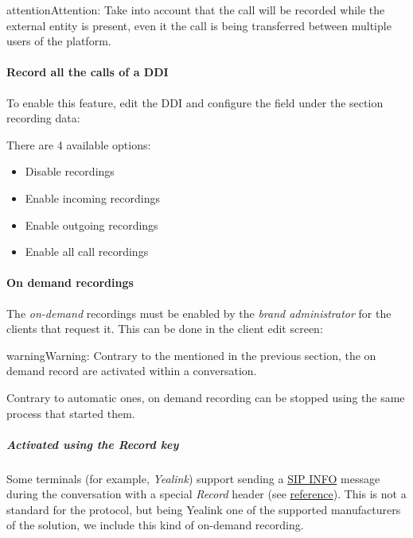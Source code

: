 \documentclass[letterpaper,10pt,english]{sphinxmanual}
\begin{document}
\begin{notice}{attention}{Attention:}
Take into account that the call will be recorded while the
external entity is present, even it the call is being transferred between
multiple users of the platform.
\end{notice}
\paragraph{Record all the calls of a DDI}

To enable this feature, edit the DDI and configure the field under the section
recording data:

There are 4 available options:
\begin{itemize}
\item {} 
Disable recordings

\item {} 
Enable incoming recordings

\item {} 
Enable outgoing recordings

\item {} 
Enable all call recordings

\end{itemize}


\paragraph{On demand recordings}
\label{administration_portal/client/vpbx/calls/call_recordings:on-demand-recordings}
The \emph{on-demand} recordings must be enabled by the \emph{brand administrator} for the
clients that request it. This can be done in the client edit screen:

\begin{notice}{warning}{Warning:}
Contrary to the {\hyperref[administration_portal/platform/services:services]{}} mentioned in the
previous section, the on demand record are activated within a conversation.
\end{notice}

Contrary to automatic ones, on demand recording can be stopped using the same
process that started them.


\subparagraph{Activated using the \emph{Record} key}
\label{administration_portal/client/vpbx/calls/call_recordings:activated-using-the-record-key}
Some terminals (for example, \emph{Yealink}) support sending a \href{https://tools.ietf.org/html/rfc6086}{SIP INFO} message during the conversation with a
special \emph{Record} header (see \href{http://www.yealink.com/Upload/document/UsingCallRecordingFeatureonYealinkPhones/UsingCallRecordingFeatureonYealinkSIPT2XPphonesRev\_610-20561729764.pdf}{reference}).
This is not a standard for the protocol, but being Yealink one of the supported
manufacturers of the solution, we include this kind of on-demand recording.
\end{document}
